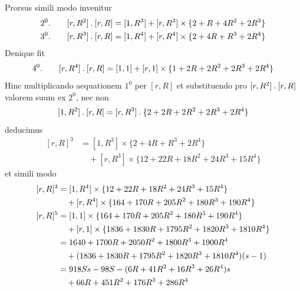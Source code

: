 Prorsus simili modo invenitur
\[
\begin{aligned}
2^0.\qquad[r,R^2]\mathbin{.}[r,R]&=[1,R^3]+[r,R^3]\times\{2+R+4R^2+2R^3\}\\
3^0.\qquad[r,R^3]\mathbin{.}[r,R]&=[1,R^4]+[r,R^4]\times\{2+4R+R^3+2R^4\}
\end{aligned}
\]
Denique fit
\[
4^0.\qquad[r,R^4]\mathbin{.}[r,R]=[1,1]+[r,1]\times\{1+2R+2R^2+2R^3+2R^4\}
\]
Hinc multiplicando aequationem $1^0$ per $[r,R]$ et substituendo pro $[r,R^2]\mathbin{.}[r,R]$ valorem suum ex $2^0$, nec non
\[
[1,R^2]\mathbin{.}[r,R]=[r,R^3]\mathbin{.}\{2+2R+2R^2+2R^3+2R^4\}
\]
deducimus
\[
\begin{aligned}
[r,R]^3&=[1,R^3]\times\{2+4R+R^3+2R^4\}\\
&\quad+[r,R^3]\times\{12+22R+18R^2+24R^3+15R^4\}
\end{aligned}
\]
et simili modo
\[
\begin{aligned}
[r,R]^4&=[1,R^4]\times\{12+22R+18R^2+24R^3+15R^4\}\\
&\quad+[r,R^4]\times\{164+170R+205R^2+180R^3+190R^4\}\\
\relax[r,R]^5&=[1,1]\times\{164+170R+205R^2+180R^3+190R^4\}\\
&\quad+[r,1]\times\{1836+1830R+1795R^2+1820R^3+1810R^4\}\\
&=1640+1700R+2050R^2+1800R^3+1900R^4\\
&\quad+(1836+1830R+1795R^2+1820R^3+1810R^4)(s-1)\\
&=918Ss-98S-(6R+41R^2+16R^3+26R^4)s\\
&\quad+66R+451R^2+176R^3+286R^4
\end{aligned}
\]

